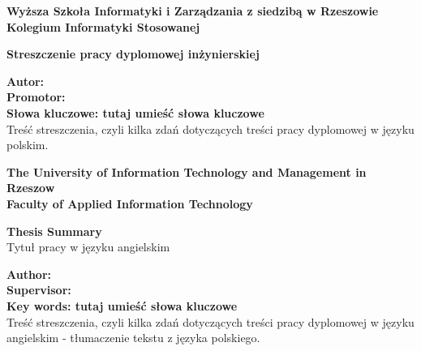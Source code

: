 ﻿%


\listoffigures
\newpage

\listoftables
\newpage

\noindent
{\footnotesize{}\textbf{Wyższa Szkoła Informatyki i Zarządzania z siedzibą w Rzeszowie\\
Kolegium Informatyki Stosowanej}
\vspace{30pt}

\begin{center}
\textbf{Streszczenie pracy dyplomowej inżynierskiej}\\
\temat
\end{center}

\vspace{30pt}
\noindent
\textbf{Autor: \autor
\\Promotor: \promotor
\\Słowa kluczowe: tutaj umieść słowa kluczowe}
\vspace{40pt}
\\Treść streszczenia, czyli kilka zdań dotyczących treści pracy dyplomowej w języku polskim.
\vspace{80pt}

\noindent
\textbf{The University of Information Technology and Management in Rzeszow\\
Faculty of Applied Information Technology}
\vspace{30pt}

\begin{center}
\textbf{Thesis Summary\\}
Tytuł pracy w języku angielskim
\end{center}

\vspace{30pt}
\noindent
\textbf{Author: \autor
\\Supervisor: \promotor
\\Key words: tutaj umieść słowa kluczowe}
\vspace{40pt}
\\Treść streszczenia, czyli kilka zdań dotyczących treści pracy dyplomowej w języku angielskim - tłumaczenie tekstu z języka polskiego.
}


